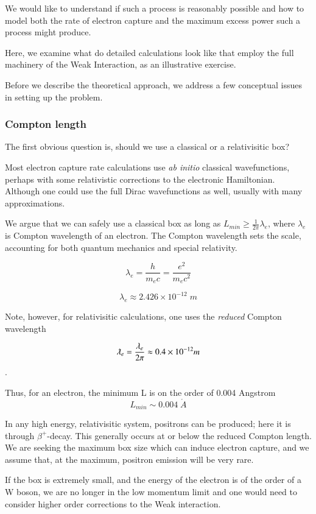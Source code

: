 \documentclass[%
 aip,
 jmp,%
 amsmath,amssymb,
 reprint,%
]{revtex4-1}
\begin{document}
We would like to understand if such a process is reasonably possible and how to model both the rate of electron capture and the maximum excess power such a process might produce.

Here, we examine what do detailed calculations look like that employ the full machinery of the Weak Interaction, as an illustrative exercise.

Before we describe the theoretical approach, we address a few conceptual issues in setting up the problem.

\subsubsection{Compton length}
The first obvious question is, should we use a classical or a relativisitic box?   

Most electron capture rate calculations use \emph{ab initio} classical wavefunctions,\cite{ec-review1,ec-review2} perhaps with some relativistic corrections to the electronic Hamiltonian. \cite{martin} Although one could use the full Dirac wavefunctions as well, usually with many approximations.

We argue that we can safely use a classical box as long as $L_{min} \ge \frac{1}{2\pi}\lambda_{e}$, where $\lambda_{e}$ is Compton wavelength of an electron. \cite{relbox,compton,planck}  The Compton wavelength sets the scale, accounting for both quantum mechanics and special relativity.

$$\lambda_{e}=\dfrac{h}{m_{e}c}=\dfrac{e^{2}}{m_{e}c^{2}}$$

$$\lambda_{e}\approx2.426\times 10^{-12}\;m$$

Note, however,  for relativisitic calculations, one uses the \emph{reduced} Compton wavelength 

$$\lambdabar_{e}=\frac{\lambda_{e}}{2\pi}\approx0.4\times 10^{-12}m$$.

Thus, for an electron, the minimum L is on the order of 0.004 Angstrom 
$$L_{min}\sim0.004\;\mathring{A}$$ 

In any high energy, relativisitic system, positrons can be produced; here it is through $\beta^{+}$-decay. This generally occurs at or below the reduced Compton length. We are seeking the maximum box size which can induce electron capture, and we assume that, at the maximum, positron emission will be very rare.

If the box is extremely small, and the energy of the electron is of the order of a W boson, we are no longer in the low momentum limit and one would need to consider higher order corrections to the Weak interaction.\cite{klein1}
\end{document}
